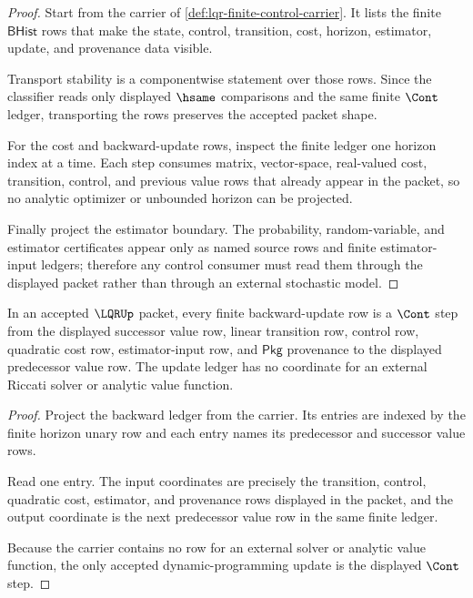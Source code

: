 \begin{proof}
Start from the carrier of \autoref{def:lqr-finite-control-carrier}. It lists the finite $\mathsf{BHist}$ rows that make the state, control, transition, cost, horizon, estimator, update, and provenance data visible.

Transport stability is a componentwise statement over those rows. Since the classifier reads only displayed $\hsame$ comparisons and the same finite $\Cont$ ledger, transporting the rows preserves the accepted packet shape.

For the cost and backward-update rows, inspect the finite ledger one horizon index at a time. Each step consumes matrix, vector-space, real-valued cost, transition, control, and previous value rows that already appear in the packet, so no analytic optimizer or unbounded horizon can be projected.

Finally project the estimator boundary. The probability, random-variable, and estimator certificates appear only as named source rows and finite estimator-input ledgers; therefore any control consumer must read them through the displayed packet rather than through an external stochastic model.
\end{proof}

\begin{theorem}
\label{thm:lqr-dynamic-programming-row}
In an accepted $\LQRUp$ packet, every finite backward-update row is a $\Cont$ step from the displayed successor value row, linear transition row, control row, quadratic cost row, estimator-input row, and $\mathsf{Pkg}$ provenance to the displayed predecessor value row. The update ledger has no coordinate for an external Riccati solver or analytic value function.
\end{theorem}
\begin{proof}
Project the backward ledger from the carrier. Its entries are indexed by the finite horizon unary row and each entry names its predecessor and successor value rows.

Read one entry. The input coordinates are precisely the transition, control, quadratic cost, estimator, and provenance rows displayed in the packet, and the output coordinate is the next predecessor value row in the same finite ledger.

Because the carrier contains no row for an external solver or analytic value function, the only accepted dynamic-programming update is the displayed $\Cont$ step.
\end{proof}

